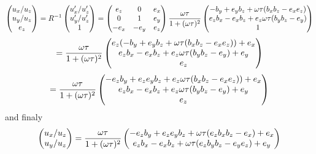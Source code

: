 \documentclass[12pt]{article} %
\newcommand{\Mypm}{\mathbin{\tikz [x=1.4ex,y=1.4ex,line width=.3ex] \draw (0.0,0) -- (1.0,0) (0.5,0.08) -- (0.5,0.92) (0.0,0.5) -- (1.0,0.5);}}%
\begin{document}
\begin{equation*}
\begin{pmatrix}
{u_{x}}/{u_{z}} \cr
{u_{y}}/{u_{z}} \cr
 e_{z}
\end{pmatrix}
= R^{-1}
\begin{pmatrix}
{u'_{x}}/{u'_{z}} \cr
{u'_{y}}/{u'_{z}} \cr
1
\end{pmatrix}
=
\begin{pmatrix} 
     e_{z} &     0 & e_{x} \cr
     0     &     1 & e_{y} \cr
    -e_{x} & -e_{y}& e_{z}
\end{pmatrix}
\frac{\omega \tau }{1 + (\omega \tau )^2}
\begin{pmatrix}
-  b_{y}       + e_{y} b_{z} +       \omega \tau (b_{x} b_{z} - e_{x} e_{z} )  \cr
   e_{z} b_{x} - e_{x} b_{z} + e_{z} \omega \tau (b_{y} b_{z} - e_{y}       )  \cr 
   1
\end{pmatrix}
\end{equation*}
\begin{equation*}
=
\frac{\omega \tau }{1 + (\omega \tau )^2}
\begin{pmatrix}
e_{z} (-  b_{y}       + e_{y} b_{z} +       \omega \tau (b_{x} b_{z} - e_{x} e_{z} )  ) + e_{x} \cr
   e_{z} b_{x} - e_{x} b_{z} + e_{z} \omega \tau (b_{y} b_{z} - e_{y}       )          + e_{y}  \cr 
   e_{z}
\end{pmatrix}
\end{equation*}
\begin{equation*}
=
\frac{\omega \tau }{1 + (\omega \tau )^2}
\begin{pmatrix}
 - e_{z} b_{y} + e_{z} e_{y} b_{z} + e_{z} \omega \tau (b_{x} b_{z} - e_{x} e_{z} )  ) + e_{x} \cr
   e_{z} b_{x} -       e_{x} b_{z} + e_{z} \omega \tau (b_{y} b_{z} - e_{y}       )    + e_{y} \cr 
   e_{z}
\end{pmatrix}
\end{equation*}
and finaly
\begin{equation}\label{finaleq}
\begin{pmatrix}
{u_{x}}/{u_{z}} \cr
{u_{y}}/{u_{z}} \cr
\end{pmatrix}
=
\frac{\omega \tau }{1 + (\omega \tau )^2}
\begin{pmatrix}
 - e_{z} b_{y} + e_{z} e_{y} b_{z} + \omega \tau (e_{z} b_{x} b_{z} - e_{x}       ) + e_{x} \cr
   e_{z} b_{x} -       e_{x} b_{z} + \omega \tau (e_{z} b_{y} b_{z} - e_{y} e_{z} ) + e_{y} \cr 
\end{pmatrix}
\end{equation}
\end{document}
